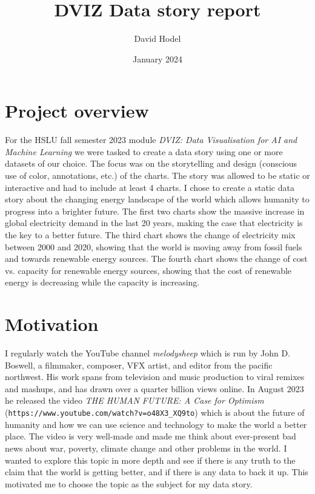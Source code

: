\documentclass{article}
\title{DVIZ Data story report}
\author{David Hodel}
\date{January 2024}
\begin{document}
\maketitle
\newpage

\tableofcontents
\newpage

\section{Project overview}

For the HSLU fall semester 2023 module \textit{DVIZ: Data Visualisation for AI and Machine Learning} we were tasked to create a data story
using one or more datasets of our choice. The focus was on the storytelling and design (conscious use of color, annotations, etc.) of the charts.
The story was allowed to be static or interactive and had to include at least 4 charts. \newline
I chose to create a static data story about the changing energy landscape of the world which allows humanity to progress into a brighter future.
The first two charts show the massive increase in global electricity demand in the last 20 years, making the case that electricity is the key to a better future.
The third chart shows the change of electricity mix between 2000 and 2020, showing that the world is moving away from fossil fuels and towards renewable energy sources.
The fourth chart shows the change of cost vs. capacity for renewable energy sources, showing that the cost of renewable energy is decreasing while the capacity is increasing. \newline

\newpage

\section{Motivation}

I regularly watch the YouTube channel \textit{melodysheep} which is run by John D. Boswell, a filmmaker, composer, VFX artist, and editor from the pacific northwest. 
His work spans from television and music production to viral remixes and mashups,
and has drawn over a quarter billion views online. \newline
In August 2023 he released the video \textit{THE HUMAN FUTURE: A Case for Optimism} (\texttt{https://www.youtube.com/watch?v=o48X3\_XQ9to})
which is about the future of humanity and how we can use science and technology to make the world a better place.
The video is very well-made and made me think about ever-present bad news about war, poverty, climate change and other problems in the world. \newline
I wanted to explore this topic in more depth and see if there is any truth to the claim that the world is getting better, and if there is any data to back it up.
This motivated me to choose the topic as the subject for my data story.
\end{document}
